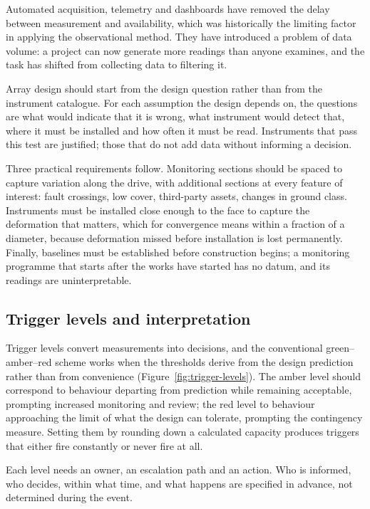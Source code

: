 Automated acquisition, telemetry and dashboards have removed the delay between
measurement and availability, which was historically the limiting factor in
applying the observational method. They have introduced a problem of data
volume: a project can now generate more readings than anyone examines, and the
task has shifted from collecting data to filtering it.

Array design should start from the design question rather than from the
instrument catalogue. For each assumption the design depends on, the questions
are what would indicate that it is wrong, what instrument would detect that,
where it must be installed and how often it must be read. Instruments that
pass this test are justified; those that do not add data without informing a
decision.

Three practical requirements follow. Monitoring sections should be spaced to
capture variation along the drive, with additional sections at every feature
of interest: fault crossings, low cover, third-party assets, changes in
ground class. Instruments must be installed close enough to the face to
capture the deformation that matters, which for convergence means within a
fraction of a diameter, because deformation missed before installation is lost
permanently. Finally, baselines must be established before construction begins; a
monitoring programme that starts after the works have started has no datum,
and its readings are uninterpretable.

\subsection{Trigger levels and interpretation}
\label{sec:triggers-interpretation}

Trigger levels convert measurements into decisions, and the conventional
green--amber--red scheme works when the thresholds derive from the design
prediction rather than from convenience (Figure~\ref{fig:trigger-levels}). The amber level should correspond to
behaviour departing from prediction while remaining acceptable, prompting
increased monitoring and review; the red level to behaviour approaching the
limit of what the design can tolerate, prompting the contingency measure.
Setting them by rounding down a calculated capacity produces triggers that
either fire constantly or never fire at all.

Each level needs an owner, an escalation path and an action. Who is informed,
who decides, within what time, and what happens are specified in advance, not
determined during the event.

